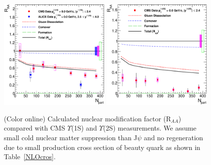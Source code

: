 \documentclass[aps,prc,preprint,superscriptaddress,showpacs,showkeys]{revtex4-1}
\begin{document}
\begin{figure}
\includegraphics[width=0.49\textwidth]{Figures/Fig7a_CMS_Y1SRAANPart.eps}
\includegraphics[width=0.49\textwidth]{Figures/Fig7b_CMS_Y2SRAANPart.eps}
\caption{(Color online) Calculated nuclear modification factor (R$_{AA}$) compared with CMS $\Upsilon$(1S) and $\Upsilon$(2S) measurements.
We assume small cold nuclear matter suppression than J$\psi$ and no regeneration due to small production cross section of beauty quark as shown in Table~\ref{NLOcros}.}
\label{fig:UpsilonRaa}
\end{figure}

\end{document}
